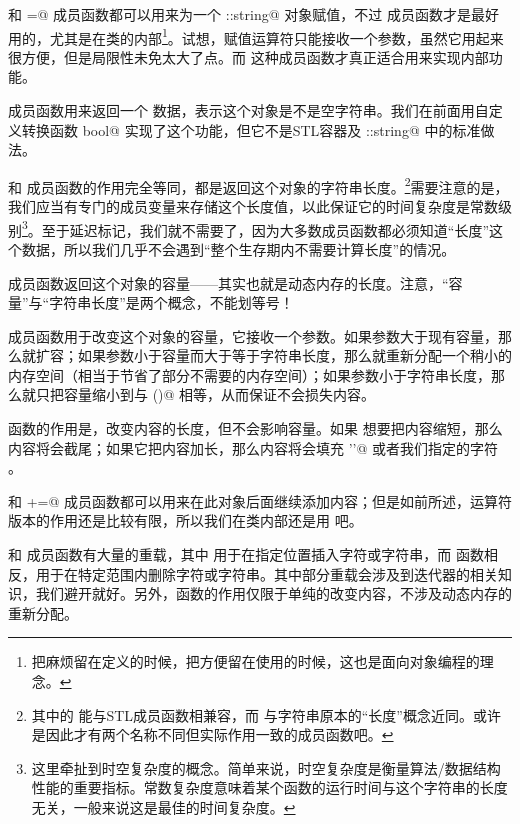 \lstinline@assign@ 和 \lstinline@operator=@ 成员函数都可以用来为一个 \lstinline@std::string@ 对象赋值，不过 \lstinline@assign@ 成员函数才是最好用的，尤其是在类的内部\footnote{把麻烦留在定义的时候，把方便留在使用的时候，这也是面向对象编程的理念。}。试想，赋值运算符只能接收一个参数，虽然它用起来很方便，但是局限性未免太大了点。而 \lstinline@assign@ 这种成员函数才真正适合用来实现内部功能。\par
\lstinline@empty@ 成员函数用来返回一个 \lstinline@bool@ 数据，表示这个对象是不是空字符串。我们在前面用自定义转换函数 \lstinline@operator bool@ 实现了这个功能，但它不是STL容器及 \lstinline@std::string@ 中的标准做法。\par
\lstinline@size@ 和 \lstinline@length@ 成员函数的作用完全等同，都是返回这个对象的字符串长度。\footnote{其中的 \lstinline@size@ 能与STL成员函数相兼容，而 \lstinline@lengh@ 与字符串原本的``长度''概念近同。或许是因此才有两个名称不同但实际作用一致的成员函数吧。}需要注意的是，我们应当有专门的成员变量来存储这个长度值，以此保证它的时间复杂度是常数级别\footnote{这里牵扯到时空复杂度的概念。简单来说，时空复杂度是衡量算法/数据结构性能的重要指标。常数复杂度意味着某个函数的运行时间与这个字符串的长度无关，一般来说这是最佳的时间复杂度。}。至于延迟标记，我们就不需要了，因为大多数成员函数都必须知道``长度''这个数据，所以我们几乎不会遇到``整个生存期内不需要计算长度''的情况。\par
\lstinline@capacity@ 成员函数返回这个对象的容量——其实也就是动态内存的长度。注意，``容量''与``字符串长度''是两个概念，不能划等号！\par
\lstinline@reserve@ 成员函数用于改变这个对象的容量，它接收一个参数。如果参数大于现有容量，那么就扩容；如果参数小于容量而大于等于字符串长度，那么就重新分配一个稍小的内存空间（相当于节省了部分不需要的内存空间）；如果参数小于字符串长度，那么就只把容量缩小到与 \lstinline@size()@ 相等，从而保证不会损失内容。\par
\lstinline@resize@ 函数的作用是，改变内容的长度，但不会影响容量。如果 \lstinline@resize@ 想要把内容缩短，那么内容将会截尾；如果它把内容加长，那么内容将会填充 \lstinline@'\0'@ 或者我们指定的字符 \lstinline@ch@。\par
\lstinline@append@ 和 \lstinline@+=@ 成员函数都可以用来在此对象后面继续添加内容；但是如前所述，运算符版本的作用还是比较有限，所以我们在类内部还是用 \lstinline@append@ 吧。\par
\lstinline@insert@ 和 \lstinline@erase@ 成员函数有大量的重载，其中 \lstinline@insert@ 用于在指定位置插入字符或字符串，而 \lstinline@erase@ 函数相反，用于在特定范围内删除字符或字符串。其中部分重载会涉及到迭代器的相关知识，我们避开就好。另外，\lstinline@erase@ 函数的作用仅限于单纯的改变内容，不涉及动态内存的重新分配。\par
